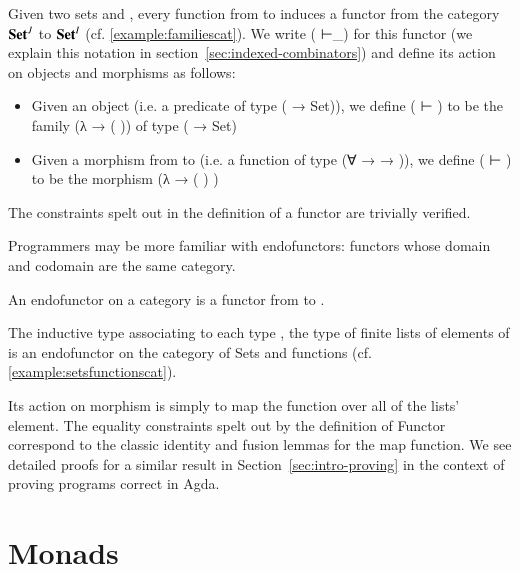 \begin{example}[Reindexing]
 Given two sets  and , every function 
from  to  induces a functor from the category ${\mathbf{Set}}^J$ to
${\mathbf{Set}}^I$ (cf. \cref{example:familiescat}).
We write {( ⊢\_)} for this functor (we explain this notation in
section~\ref{sec:indexed-combinators}) and define its action on objects
and morphisms as follows:

\begin{itemize}
  \item Given an object  (i.e. a predicate of type ( → Set)),
    we define {( ⊢ )} to be the
    family {(λ →  ( ))} of type ( → Set)
  \item Given a morphism  from  to  (i.e. a function
    of type {(∀ →   →  )}),
    we define {( ⊢ )} to be
    the morphism {(λ   →  ( ) )}
\end{itemize}

The constraints spelt out in the definition of a functor are trivially verified.
\end{example}

Programmers may be more familiar with endofunctors: functors whose domain
and codomain are the same category.

\begin{definition}[Endofunctor]\label{def:endofunctor}
An endofunctor on a category  is a functor
from  to .
\end{definition}

\begin{example}[List]
\label{example:listfunctor}
The inductive type associating to each type , the type of finite
lists of elements of  is an endofunctor on the category of Sets
and functions (cf. \cref{example:setsfunctionscat}).

Its action on morphism is simply to map the function over all of the lists'
element. The equality constraints spelt out by the definition of Functor
correspond to the classic identity and fusion lemmas for the map function.
We see detailed proofs for a similar result in Section~\ref{sec:intro-proving}
in the context of proving programs correct in Agda.
\end{example}

\section{Monads}

